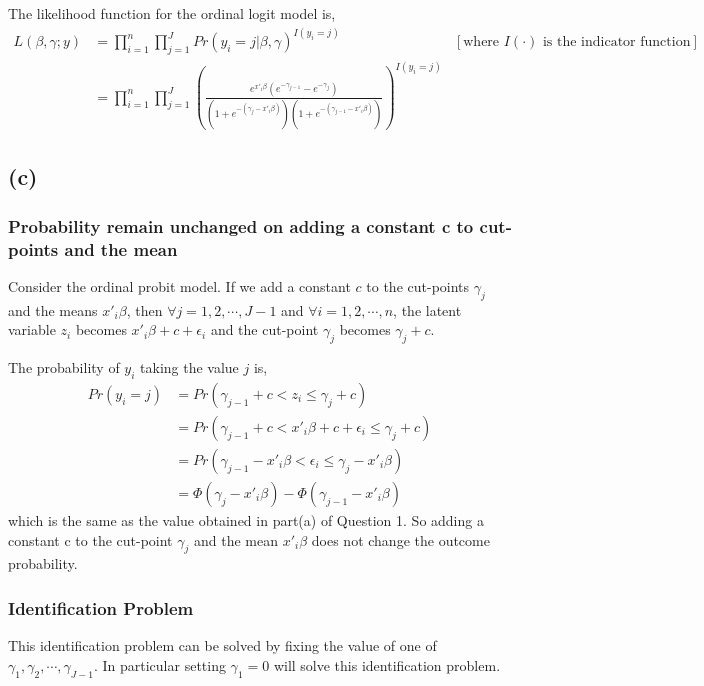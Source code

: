 \documentclass[a4paper]{article}
\begin{document}
The likelihood function for the ordinal logit model is,
\begin{align*}
    L(\beta,\gamma;y) &= \prod_{i=1}^{n}\prod_{j=1}^{J} Pr(y_i = j | \beta, \gamma)^{I(y_i = j)} &[\text{where } I(\cdot) \text{ is the indicator function}]\\
                      &= \displaystyle \prod_{i=1}^{n}\prod_{j=1}^{J} \left(\frac{e^{x'_i\beta}(e^{-\gamma_{j-1}} - e^{-\gamma_{j}})}{(1+e^{-(\gamma_j - x'_{i}\beta)})(1+e^{-(\gamma_{j-1} - x'_{i}\beta)})}\right)^{I(y_i = j)}
\end{align*}

\subsection*{(c)}

\subsubsection*{Probability remain unchanged on adding a constant c to cut-points and the mean}

Consider the ordinal probit model. If we add a constant $c$ to the cut-points $\gamma_j$ and the means $x'_i\beta$, then $\forall j = 1,2,\cdots, J-1$ and $\forall i = 1,2,\cdots, n$,  the latent variable $z_i$ becomes $x'_i\beta + c + \epsilon_i$ and the cut-point $\gamma_j$ becomes $\gamma_j + c$.
\vspace{0.25cm}

\noindent The probability of $y_i$ taking the value $j$ is,
\begin{align*}
    Pr(y_i = j) &= Pr(\gamma_{j-1}+c < z_i \leq \gamma_j + c)\\
                &= Pr(\gamma_{j-1}+c < x'_i\beta + c + \epsilon_i \leq \gamma_j + c)\\
                &= Pr(\gamma_{j-1} - x'_i\beta  < \epsilon_i \leq \gamma_j - x'_i\beta ) \\
                &= \Phi(\gamma_j - x'_i\beta) - \Phi(\gamma_{j-1} - x'_i\beta)
\end{align*}
which is the same as the value obtained in part(a) of Question 1. So adding a constant c to the cut-point $\gamma_j$ and the mean $x'_i\beta$ does not change the outcome probability.

\subsubsection*{Identification Problem}
This identification problem can be solved by fixing the value of one of $\gamma_1, \gamma_2, \cdots, \gamma_{J-1}$. In particular setting $\gamma_1 = 0$ will solve this identification problem.
\end{document}

